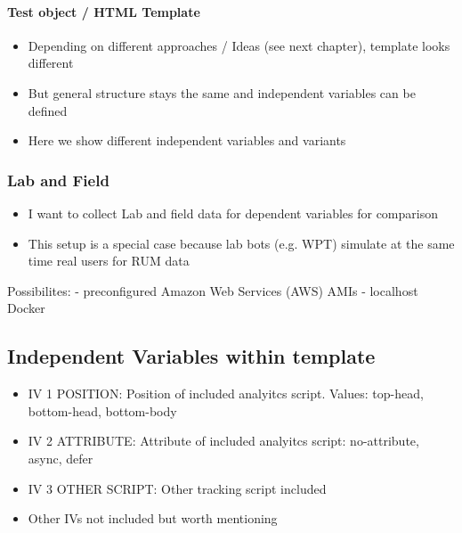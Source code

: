 \paragraph{Test object / HTML Template}

\begin{itemize}
\item Depending on different approaches / Ideas (see next chapter), template looks different
\item But general structure stays the same and independent variables can be defined
\item Here we show different independent variables and variants
\end{itemize}


\subsubsection{Lab and Field}

\begin{itemize}
\item I want to collect Lab and field data for dependent variables for comparison
\item This setup is a special case because lab bots (e.g. WPT) simulate at the same time real users for RUM data
\end{itemize}





Possibilites:
- preconfigured Amazon Web Services (AWS) AMIs
- localhost Docker





\subsection{Independent Variables within template}


\begin{itemize}
\item IV 1 POSITION: Position of included analyitcs script. Values: top-head, bottom-head, bottom-body
\item IV 2 ATTRIBUTE: Attribute of included analyitcs script: no-attribute, async, defer
\item IV 3 OTHER SCRIPT: Other tracking script included
\item Other IVs not included but worth mentioning
\end{itemize}




